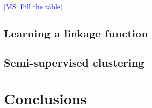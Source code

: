 \documentclass{article}
\newcommand{\msnote}[1]{\textcolor{blue}{[MS: #1]}}
\begin{document}
\msnote{Fill the table}


\subsection{Learning a linkage function}

\subsection{Semi-supervised clustering}



\section{Conclusions}
\label{conclusions}






\end{document}

